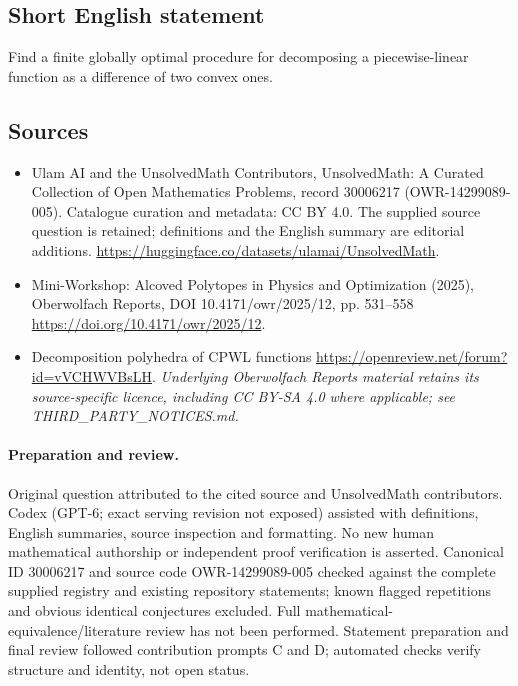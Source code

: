 \documentclass[11pt]{article}
\begin{document}
\subsection{Short English statement}
Find a finite globally optimal procedure for decomposing a piecewise-linear function as a difference of two convex ones.
\subsection{Sources}
\begin{itemize}
\item[\hypertarget{source:30006217:1}{S1}] Ulam AI and the UnsolvedMath Contributors, UnsolvedMath: A Curated Collection of Open Mathematics Problems, record 30006217 (OWR-14299089-005). Catalogue curation and metadata: CC BY 4.0. The supplied source question is retained; definitions and the English summary are editorial additions.
\url{https://huggingface.co/datasets/ulamai/UnsolvedMath}.
\item[\hypertarget{source:30006217:2}{S2}] Mini-Workshop: Alcoved Polytopes in Physics and Optimization (2025), Oberwolfach Reports, DOI 10.4171/owr/2025/12, pp. 531--558
\url{https://doi.org/10.4171/owr/2025/12}.
\item[\hypertarget{source:30006217:3}{S3}] Decomposition polyhedra of CPWL functions
\url{https://openreview.net/forum?id=vVCHWVBsLH}.
\textit{Underlying Oberwolfach Reports material retains its source-specific licence, including CC BY-SA 4.0 where applicable; see THIRD\_PARTY\_NOTICES.md.}
\end{itemize}
\paragraph{Preparation and review.}
Original question attributed to the cited source and UnsolvedMath contributors. Codex (GPT-6; exact serving revision not exposed) assisted with definitions, English summaries, source inspection and formatting. No new human mathematical authorship or independent proof verification is asserted. Canonical ID 30006217 and source code OWR-14299089-005 checked against the complete supplied registry and existing repository statements; known flagged repetitions and obvious identical conjectures excluded. Full mathematical-equivalence/literature review has not been performed. Statement preparation and final review followed contribution prompts C and D; automated checks verify structure and identity, not open status.
\label{end:30006217}
\end{document}
